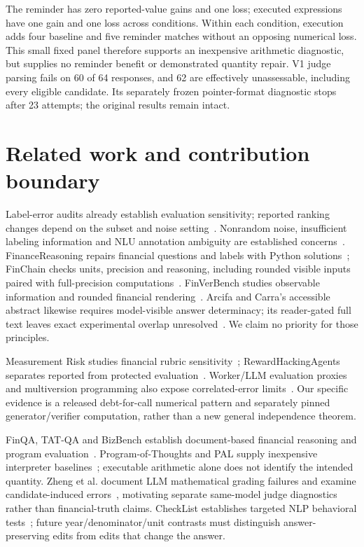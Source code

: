 The reminder has zero reported-value gains and one loss; executed expressions have one gain and one loss across conditions. Within each condition, execution adds four baseline and five reminder matches without an opposing numerical loss. This small fixed panel therefore supports an inexpensive arithmetic diagnostic, but supplies no reminder benefit or demonstrated quantity repair. V1 judge parsing fails on 60 of 64 responses, and 62 are effectively unassessable, including every eligible candidate. Its separately frozen pointer-format diagnostic stops after 23 attempts; the original results remain intact.

\section{Related work and contribution boundary}
Label-error audits already establish evaluation sensitivity; reported ranking changes depend on the subset and noise setting~\cite{labelerrors}. Nonrandom noise, insufficient labeling information and NLU annotation ambiguity are established concerns~\cite{labelnoise,benchmarking}. FinanceReasoning repairs financial questions and labels with Python solutions~\cite{financereasoning}; FinChain checks units, precision and reasoning, including rounded visible inputs paired with full-precision computations~\cite{finchain}. FinVerBench studies observable information and rounded financial rendering~\cite{finverbench}. Arcifa and Carra's accessible abstract likewise requires model-visible answer determinacy; its reader-gated full text leaves exact experimental overlap unresolved~\cite{faircheap}. We claim no priority for those principles.

Measurement Risk studies financial rubric sensitivity~\cite{measurementrisk}; RewardHackingAgents separates reported from protected evaluation~\cite{rewardhackingagents}. Worker/LLM evaluation proxies and multiversion programming also expose correlated-error limits~\cite{aqer,independence}. Our specific evidence is a released debt-for-call numerical pattern and separately pinned generator/verifier computation, rather than a new general independence theorem.

FinQA, TAT-QA and BizBench establish document-based financial reasoning and program evaluation~\cite{finqa,tatqa,bizbench}. Program-of-Thoughts and PAL supply inexpensive interpreter baselines~\cite{pot,pal}; executable arithmetic alone does not identify the intended quantity. Zheng et al. document LLM mathematical grading failures and examine candidate-induced errors~\cite{llmjudge}, motivating separate same-model judge diagnostics rather than financial-truth claims. CheckList establishes targeted NLP behavioral tests~\cite{checklist}; future year/denominator/unit contrasts must distinguish answer-preserving edits from edits that change the answer.

